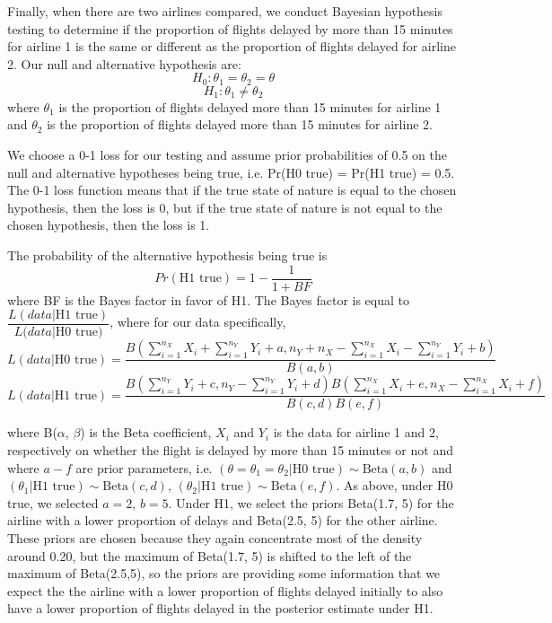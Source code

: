 \documentclass{article} %
\begin{document}
Finally, when there are two airlines compared, we conduct Bayesian hypothesis testing to determine if the proportion of flights delayed by more than 15 minutes for airline 1 is the same or different as the proportion of flights delayed for airline 2.  Our null and alternative hypothesis are:
$$H_0: \theta_1 = \theta_2 = \theta$$
$$H_1: \theta_1 \neq \theta_2$$
where $\theta_1$ is the proportion of flights delayed more than 15 minutes for airline 1 and $\theta_2$ is the proportion of flights delayed more than 15 minutes for airline 2.  

We choose a 0-1 loss for our testing and assume prior probabilities of 0.5 on the null and alternative hypotheses being true, i.e. Pr(H0 true) = Pr(H1 true) = 0.5. The 0-1 loss function means that if the true state of nature is equal to the chosen hypothesis, then the loss is 0, but if the true state of nature is not equal to the chosen hypothesis, then the loss is 1.  

The probability of the alternative hypothesis being true is
$$Pr(\mbox{H1 true}) = 1 - \dfrac{1}{1+BF}$$ where BF is the Bayes factor in favor of H1.  The Bayes factor is equal to $\dfrac{L(data | \mbox{H1 true})}{L(data | \mbox{H0 true)}}$, where for our data specifically, 
$$L(data | \mbox{H0 true}) = \dfrac{B(\sum_{i=1}^{n_X}X_i + \sum_{i=1}^{n_Y}Y_i + a, n_Y +n_X -  \sum_{i=1}^{n_X}X_i - \sum_{i=1}^{n_Y}Y_i + b) }{B(a,b)}$$
$$L(data | \mbox{H1 true}) = \dfrac{B(\sum_{i=1}^{n_Y}Y_i + c, n_Y - \sum_{i=1}^{n_Y}Y_i +d) B(\sum_{i=1}^{n_X}X_i + e, n_X - \sum_{i=1}^{n_X}X_i +f)}{B(c,d)B(e,f)}$$

where B($\alpha$, $\beta$) is the Beta coefficient, $X_i$ and $Y_i$ is the data for airline 1 and 2, respectively on whether the flight is delayed by more than 15 minutes or not and where $a-f$ are prior parameters, i.e. $(\theta = \theta_1 = \theta_2 | \mbox{H0 true})\sim \mbox{Beta}(a,b)$ and $(\theta_1 |\mbox{H1 true})\sim \mbox{Beta}(c,d)$,    $(\theta_2 | \mbox{H1 true})\sim \mbox{Beta}(e,f)$.  As above, under H0 true, we selected $a=2$, $b=5$.  Under H1, we select the priors Beta(1.7, 5) for the airline with a lower proportion of delays and Beta(2.5, 5) for the other airline. These priors are chosen because they again concentrate most of the density around 0.20, but the maximum of Beta(1.7, 5) is shifted to the left of the maximum of Beta(2.5,5), so the priors are providing some information that we expect the  the airline with a lower proportion of flights delayed initially to also have a lower proportion of flights delayed in the posterior estimate under H1.  
\end{document}
